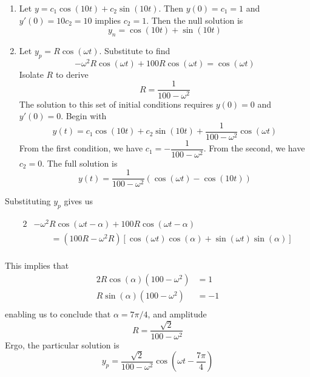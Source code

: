\documentclass[a4paper]{article}
\begin{document}
\begin{enumerate}[label=(\alph*)]
	\item Let \(y = c_{1} \cos\left( 10 t \right) + c_{2} \sin\left( 10 t \right)\). Then \(y \!\left( 0 \right) = c_{1} = 1\) and \(y' \!\left( 0 \right) = 10 c_{2} = 10\) implies \(c_{2} = 1\). Then the null solution is
	\[
		y_{n} = \cos\left( 10 t \right) + \sin\left( 10 t \right)
	\]
\item Let \(y_{p} = R \cos\left( \omega t \right)\). Substitute to find
	\[
		-\omega^{2} R \cos\left( \omega t \right) + 100 R \cos\left( \omega t \right) = \cos\left( \omega t \right)
	\]
	Isolate \(R\) to derive
	\[
		R = \frac{1}{100 - \omega^{2}}
	\]
	The solution to this set of initial conditions requires \(y \!\left( 0 \right) = 0 \) and \(y' \!\left( 0 \right) = 0\). Begin with
	\[
		y \!\left( t \right) = c_{1} \cos\left( 10 t \right) + c_{2} \sin\left( 10 t \right) + \frac{1}{100 - \omega^{2}} \cos\left( \omega t \right)	
	\]
	From the first condition, we have \(c_{1} = -\dfrac{1}{100 - \omega^{2}}\). From the second, we have \(c_{2} = 0\). The full solution is
	\[
		y \!\left( t \right) = \frac{1}{100 - \omega^{2}} \!\left( \cos\left( \omega t \right) - \cos\left( 10t \right) \right) 
	\]
\end{enumerate}


Substituting \(y_{p}\) gives us

\begin{alignat*}{2}
	& -\omega^{2} R \cos\left( \omega t - \alpha  \right) + 100 R \cos\left( \omega t - \alpha  \right) \\
		 & \qquad = \!\left( 100R - \omega^{2}R \right) \!\left[ \cos\left( \omega t \right)\cos\left( \alpha  \right) + \sin\left( \omega t \right)\sin\left( \alpha  \right) \right]  \\
\end{alignat*}

This implies that
\begin{alignat*}{2}
	R \cos\left( \alpha  \right) \!\left( 100 - \omega^{2} \right) & = 1 \\
	R \sin\left( \alpha  \right) \!\left( 100 - \omega^{2} \right) & = -1 \\ 
\end{alignat*}
enabling us to conclude that \(\alpha = 7 \pi / 4\), and amplitude
\[
	R = \frac{\sqrt{2}}{100 - \omega^{2}}
\]
Ergo, the particular solution is
\[
	y_{p} = \frac{\sqrt{2}}{100 - \omega^{2}} \cos\left( \omega t - \frac{7 \pi }{4} \right)
\]
\end{document}
